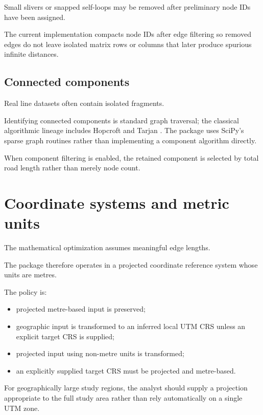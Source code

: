 \documentclass[11pt]{article}
\begin{document}
Small slivers or snapped self-loops may be removed after preliminary node IDs
have been assigned.

The current implementation compacts node IDs after edge filtering so removed
edges do not leave isolated matrix rows or columns that later produce spurious
infinite distances.

\subsection{Connected components}

Real line datasets often contain isolated fragments.

Identifying connected components is standard graph traversal; the classical
algorithmic lineage includes Hopcroft and Tarjan \cite{HopcroftTarjan1973}.
The package uses SciPy's sparse graph routines rather than implementing a
component algorithm directly.

When component filtering is enabled, the retained component is selected by
total road length rather than merely node count.

\section{Coordinate systems and metric units}

The mathematical optimization assumes meaningful edge lengths.

The package therefore operates in a projected coordinate reference system whose
units are metres.

The policy is:

\begin{itemize}[leftmargin=1.5em]

\item projected metre-based input is preserved;

\item geographic input is transformed to an inferred local UTM CRS unless an
explicit target CRS is supplied;

\item projected input using non-metre units is transformed;

\item an explicitly supplied target CRS must be projected and metre-based.

\end{itemize}

For geographically large study regions, the analyst should supply a projection
appropriate to the full study area rather than rely automatically on a single
UTM zone.
\end{document}
